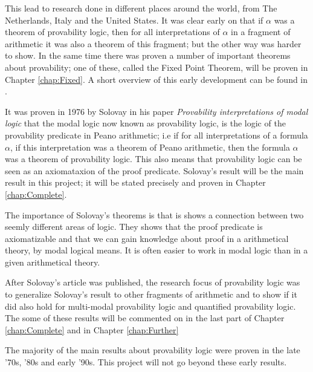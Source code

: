 \documentclass[../main.tex]{subfiles}
\begin{document}
This lead to research done in different places around the world, from The
Netherlands, Italy and the United States. It was clear early on that if
$\alpha$ was a theorem of provability logic, then for all interpretations of
$\alpha$ in a fragment of arithmetic it  was also a theorem of this fragment; but
the other way was harder to show. In the same time there was proven a number of
important theorems about provability; one of these, called the Fixed Point
Theorem,  will be proven in Chapter
\ref{chap:Fixed}.
A short overview of this early
development can be found in \citet{Bool1991}.

It was proven in 1976 by Solovay in his paper \textit{Provability
interpretations of modal logic} that the modal
logic now known as provability logic, is the logic of the provability predicate
in Peano arithmetic; i.e if for all interpretations
of a formula $\alpha$, if this interpretation was a theorem of Peano
arithmetic,
then the formula $\alpha$ was a theorem of provability logic. This also means that
provability logic can be seen as an axiomataxion of the proof predicate.
Solovay's result will be the main result in this project; it will be stated
precisely and proven in Chapter \ref{chap:Complete}.

The importance of Solovay's theorems is that is shows a connection between two
seemly different areas of logic. They shows that the proof predicate is
axiomatizable and that we can gain knowledge about proof in a arithmetical
theory, by modal logical means. It is often easier to work in modal logic than
in a given arithmetical theory.

After Solovay's article was published, the research focus of provability logic
was to generalize Solovay's result to other fragments of arithmetic and to
show if 
it did also hold for multi-modal provability logic and quantified provability
logic. The some of these results will be commented on in the last part of
Chapter \ref{chap:Complete} and in Chapter \ref{chap:Further}

The majority of the main results about provability logic were proven in the late
'70s, '80s and early '90s. This project will not go beyond these early results.
\end{document}
